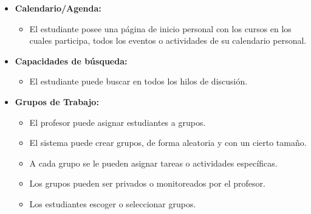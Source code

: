 	\begin{itemize}
		\item \textbf {Calendario/Agenda:}
			\begin{itemize}
				\item El estudiante posee una página de inicio personal con los cursos en los cuales participa, todos los eventos o actividades de su calendario personal.
			\end{itemize}
	\end{itemize}
	\begin{itemize}
		\item \textbf{Capacidades de búsqueda:}
			\begin{itemize}
				\item El estudiante puede buscar en todos los hilos de discusión.
			\end{itemize}
	\end{itemize}
	\begin{itemize}
		\item \textbf{Grupos de Trabajo:}
			\begin{itemize}
				\item El profesor puede asignar estudiantes a grupos.
				\item El sistema puede crear grupos, de forma aleatoria y con un cierto tamaño.
				\item A cada grupo se le pueden asignar tareas o actividades específicas.
				\item Los grupos pueden ser privados o monitoreados por el profesor.
				\item Los estudiantes escoger o seleccionar grupos.
			\end{itemize}
	\end{itemize}
